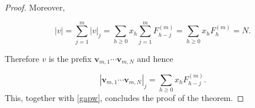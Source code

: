 \documentclass{amsart}
\newtheorem{lemma}[theorem]{Lemma}
\newcommand{\NN}{\mathbb N}
\newcommand{\ZZ}{\mathbb Z}
\begin{document}
\begin{proof}
Moreover,

\[
|v|
=
\sum_{j=1}^m|v|_j
=
\sum_{h\ge0}x_h
\sum_{j=1}^mF_{h-j}^{(m)}
=
\sum_{h\ge0}x_hF_h^{(m)}
=
N.
\]

Therefore $v$ is the prefix
$\mathbf v_{m,1}\cdots\mathbf v_{m,N}$ and hence

\[
|\mathbf v_{m,1}\cdots\mathbf v_{m,N}|_j
=
\sum_{h\ge0}x_hF_{h-j}^{(m)}.
\]
This, together with \eqref{gapw}, concludes the proof of the theorem. 





\end{proof}


\end{document}

